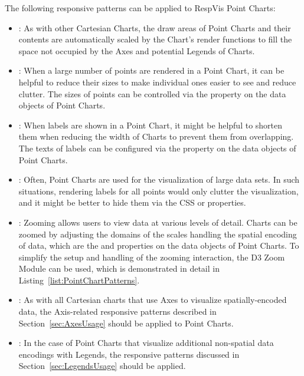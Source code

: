 The following responsive patterns can be applied to RespVis Point
Charts:
\begin{itemize}
\item {}: As with other Cartesian Charts, the
  draw areas of Point Charts and their contents are automatically
  scaled by the Chart's render functions to fill the space not
  occupied by the Axes and potential Legends of Charts.

\item {}: When a large number of points are
  rendered in a Point Chart, it can be helpful to reduce their sizes
  to make individual ones easier to see and reduce clutter.  The sizes
  of points can be controlled via the  property on the
  data objects of Point Charts.

\item {}: When labels are shown in a Point
  Chart, it might be helpful to shorten them when reducing the width
  of Charts to prevent them from overlapping.  The texts of labels can
  be configured via the  property on the data objects of
  Point Charts.

\item {}: Often, Point Charts are used for the
  visualization of large data sets.  In such situations, rendering
  labels for all points would only clutter the visualization, and it
  might be better to hide them via the CSS  or
   properties.

\item {}: Zooming allows users to view data at
  various levels of detail.  Charts can be zoomed by adjusting the
  domains of the scales handling the spatial encoding of data, which
  are the  and  properties on the data
  objects of Point Charts.  To simplify the setup and handling of the
  zooming interaction, the D3 Zoom Module \parencite{D3Zoom} can be
  used, which is demonstrated in detail in
  Listing~\ref{list:PointChartPatterns}.

\item {}: As with all Cartesian charts that
  use Axes to visualize spatially-encoded data, the Axis-related
  responsive patterns described in Section~\ref{sec:AxesUsage} should
  be applied to Point Charts.

\item {}: In the case of Point Charts
  that visualize additional non-spatial data encodings with Legends,
  the responsive patterns discussed in Section~\ref{sec:LegendsUsage}
  should be applied.
\end{itemize}




